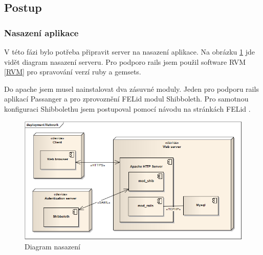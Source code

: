 
\subsection{Postup}
\subsubsection{Nasazení aplikace}
V této fázi bylo potřeba připravit server na nasazení aplikace. Na obrázku \ref{fig:deployment} jde vidět diagram nasazení serveru. Pro podporo rails jsem použil software RVM \ref{RVM} pro spravování verzí ruby a gemsets.

Do apache jsem musel nainstalovat dva zásuvné moduly. Jeden pro podporu rails aplikací Passanger a pro zprovoznění FELid modul Shibboleth. Pro samotnou konfiguraci Shibbolethu jsem postupoval pomocí návodu na stránkách FELid \cite{felid_navod}.



\begin{figure}[h]
\begin{center}
\includegraphics[scale=0.7]{figures/deployment}
\caption{Diagram nasazení}
\label{fig:deployment}
\end{center}
\end{figure}


